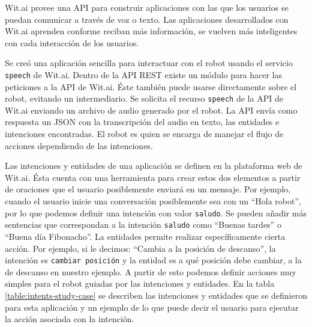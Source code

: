Wit.ai provee una API para construir aplicaciones
con las que los usuarios se puedan comunicar a través de voz o texto.
Las aplicaciones desarrollados con Wit.ai aprenden conforme reciban más 
información, se vuelven más inteligentes con cada interacción de los usuarios.

Se creó una aplicación sencilla
para interactuar con el robot usando el servicio \texttt{speech} de
Wit.ai.
Dentro de la API REST existe un módulo para hacer las peticiones
a la API de Wit.ai. Éste también puede usarse directamente sobre
el robot, evitando un intermediario.
Se solicita el recurso \texttt{speech} de la API de Wit.ai 
enviando
un archivo de audio generado por el robot. La API
envía como respuesta un JSON con la transcripción del audio 
en texto, las entidades e intenciones encontradas.
El robot es quien se encarga de manejar el flujo de
acciones dependiendo de las intenciones.

Las intenciones y entidades de una aplicación se definen en la plataforma
web de Wit.ai. Ésta cuenta con una herramienta para
crear estos dos elementos a partir de oraciones que el usuario
posiblemente enviará en un mensaje. Por ejemplo,
cuando el usuario inicie una conversación posiblemente
sea con un ``Hola robot'', por lo que podemos definir una
intención con valor \texttt{saludo}.
Se pueden añadir más sentencias
que correspondan a la intención \texttt{saludo}
como ``Buenas tardes'' o
``Buena día Fibonacho''.
La entidades permite realizar específicamente cierta acción.
Por ejemplo, si le decimos: ``Cambia a la posición de descanso'', la intención es \texttt{cambiar posición} y la
entidad es a qué posición debe cambiar, a la de descanso
en nuestro ejemplo.
A partir de esto podemos definir acciones muy simples
para el robot guiadas por las intenciones y entidades. En la tabla \ref{table:intents-study-case} se describen las intenciones y entidades que se
definieron para esta aplicación
y un ejemplo de lo que puede decir el usuario para ejecutar la acción asociada con la intención.

